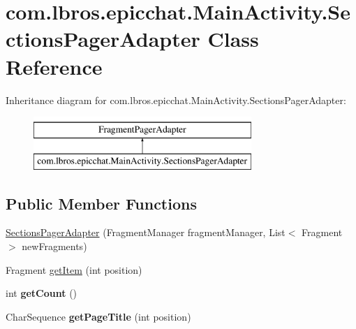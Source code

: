 \hypertarget{classcom_1_1lbros_1_1epicchat_1_1_main_activity_1_1_sections_pager_adapter}{\section{com.\-lbros.\-epicchat.\-Main\-Activity.\-Sections\-Pager\-Adapter Class Reference}
\label{classcom_1_1lbros_1_1epicchat_1_1_main_activity_1_1_sections_pager_adapter}
}
Inheritance diagram for com.\-lbros.\-epicchat.\-Main\-Activity.\-Sections\-Pager\-Adapter\-:\begin{figure}[H]
\begin{center}
\leavevmode
\includegraphics[height=2.000000cm]{classcom_1_1lbros_1_1epicchat_1_1_main_activity_1_1_sections_pager_adapter}
\end{center}
\end{figure}
\subsection*{Public Member Functions}
\begin{DoxyCompactItemize}
\item 
\hyperlink{classcom_1_1lbros_1_1epicchat_1_1_main_activity_1_1_sections_pager_adapter_ad5658b6a9ed85b609ec01629e89d8bf0}{Sections\-Pager\-Adapter} (Fragment\-Manager fragment\-Manager, List$<$ Fragment $>$ new\-Fragments)
\item 
Fragment \hyperlink{classcom_1_1lbros_1_1epicchat_1_1_main_activity_1_1_sections_pager_adapter_ab17c087010f88574109d3e4c71cf4569}{get\-Item} (int position)
\item 
\hypertarget{classcom_1_1lbros_1_1epicchat_1_1_main_activity_1_1_sections_pager_adapter_a271b201f413fe3b05af117f20e84ffaf}{int {\bfseries get\-Count} ()}\label{classcom_1_1lbros_1_1epicchat_1_1_main_activity_1_1_sections_pager_adapter_a271b201f413fe3b05af117f20e84ffaf}

\item 
\hypertarget{classcom_1_1lbros_1_1epicchat_1_1_main_activity_1_1_sections_pager_adapter_a7efa2088e3dff3af4c2dc74a23432df0}{Char\-Sequence {\bfseries get\-Page\-Title} (int position)}\label{classcom_1_1lbros_1_1epicchat_1_1_main_activity_1_1_sections_pager_adapter_a7efa2088e3dff3af4c2dc74a23432df0}

\end{DoxyCompactItemize}


